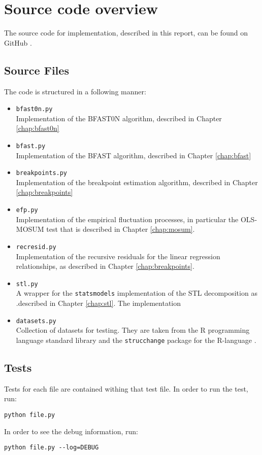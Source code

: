 \documentclass[main.tex]{subfiles}
\begin{document}
\chapter{Source code overview}
\label{a_chap:source_code_overview}
The source code for implementation, described in this report, can be found on GitHub \cite{my-github}.
\section{Source Files}
\label{sec:source_files}
The code is structured in a following manner:
\begin{itemize}
\item \texttt{bfast0n.py}\\
  Implementation of the BFAST0N algorithm, described in Chapter \ref{chap:bfast0n}
\item \texttt{bfast.py}\\
  Implementation of the BFAST algorithm, described in Chapter \ref{chap:bfast}
\item \texttt{breakpoints.py}\\
  Implementation of the breakpoint estimation algorithm, described in Chapter \ref{chap:breakpoints}
\item \texttt{efp.py}\\
  Implementation of the empirical fluctuation processes, in particular the OLS-MOSUM test that is
  described in Chapter \ref{chap:mosum}.
\item \texttt{recresid.py}\\
  Implementation of the recursive residuals for the linear regression relationships,
  as described in Chapter \ref{chap:breakpoints}.
\item \texttt{stl.py} \\
  A wrapper for the \texttt{statsmodels} \cite{statsmodels} implementation of the STL decomposition as
  .described in Chapter \ref{chap:stl}. The implementation
\item \texttt{datasets.py}\\
  Collection of datasets for testing. They are taken from the R programming language standard library
  \cite{r-datasets} and
  the \texttt{strucchange} package for the R-language \cite{strucchange_code}.
\end{itemize}

\section{Tests}
\label{sec:source_files}
Tests for each file are contained withing that test file. In order to run the test, run:
\begin{verbatim}
python file.py
\end{verbatim}
In order to see the debug information, run:
\begin{verbatim}
python file.py --log=DEBUG
\end{verbatim}

\biblio
\end{document}
